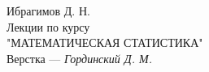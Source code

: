 \begin{titlepage}
\begin{center}

\hspace{0pt}
\vfill
{\LARGE Ибрагимов Д. Н. \\}
\vspace{26pt}
{\huge Лекции по курсу \\}
{\huge "МАТЕМАТИЧЕСКАЯ СТАТИСТИКА" \\}
\vspace{26pt}
{\LARGE Верстка --- \textit{Гординский Д. М.}}
\vfill
\hspace{0pt}

\end{center}
\end{titlepage}
\pagebreak
